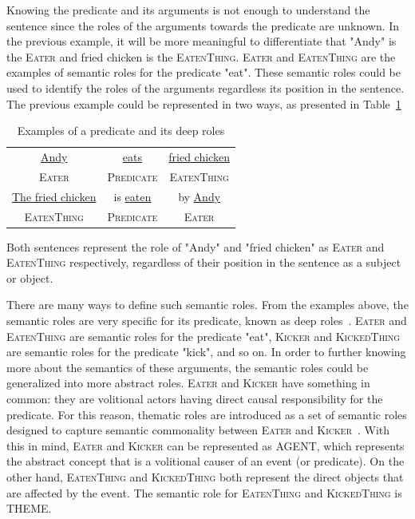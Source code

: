 Knowing the predicate and its arguments is not enough to understand the sentence since the roles of the arguments towards the predicate are unknown. In the previous example, it will be more meaningful to differentiate that "Andy" is the \textsc{Eater} and fried chicken is the \textsc{EatenThing}. \textsc{Eater} and \textsc{EatenThing} are the examples of semantic roles for the predicate "eat". These semantic roles could be used to identify the roles of the arguments regardless its position in the sentence. The previous example could be represented in two ways, as presented in Table~\ref{tab:examplesrl2}

\begin{table}
	\centering
	\caption{Examples of a predicate and its deep roles}
	\label{tab:examplesrl2}
	\begin{tabular}{|ccc|}
		\hline
		\underline{Andy} & \underline{eats} & \underline{fried chicken} \\
		\textsc{Eater} & \textsc{Predicate} & \textsc{EatenThing} \\
		\hline
		\underline{The fried chicken} & is \underline{eaten} & by \underline{Andy} \\
		\textsc{EatenThing} & \textsc{Predicate} & \textsc{Eater} \\
		\hline
	\end{tabular}
\end{table}

Both sentences represent the role of "Andy" and "fried chicken" as \textsc{Eater} and \textsc{EatenThing} respectively, regardless of their position in the sentence as a subject or object.

There are many ways to define such semantic roles. From the examples above, the semantic roles are very specific for its predicate, known as deep roles~\citep{jurafsky2016speech}. \textsc{Eater} and \textsc{EatenThing} are semantic roles for the predicate "eat", \textsc{Kicker} and \textsc{KickedThing} are semantic roles for the predicate "kick", and so on. In order to further knowing more about the semantics of these arguments, the semantic roles could be generalized into more abstract roles. \textsc{Eater} and \textsc{Kicker} have something in common: they are volitional actors having direct causal responsibility for the predicate. For this reason, thematic roles are introduced as a set of semantic roles designed to capture semantic commonality between \textsc{Eater} and \textsc{Kicker}~\citep{jurafsky2016speech}. With this in mind, \textsc{Eater} and \textsc{Kicker} can be represented as AGENT, which represents the abstract concept that is a volitional causer of an event (or predicate). On the other hand, \textsc{EatenThing} and \textsc{KickedThing} both represent the direct objects that are affected by the event. The semantic role for \textsc{EatenThing} and \textsc{KickedThing} is THEME.

